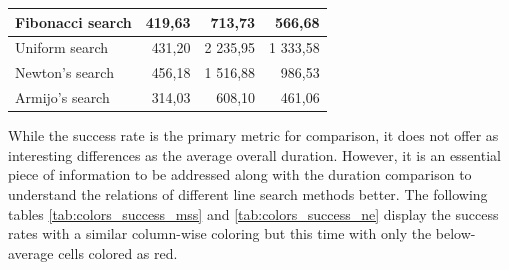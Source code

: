 \documentclass[a4paper,english,titlepage,12pt]{article}
\begin{document}
\begin{table}[H]
\begin{tabular}{|l|r|r|r|}
    Fibonacci search                                                           & 419,63                                                    & \cellcolor[HTML]{C9E9D9}713,73                           & \cellcolor[HTML]{A5DABF}566,68                                \\ \hline
    Uniform search                                                             & 431,20                                                    & \cellcolor[HTML]{E67B73}2 235,95                         & \cellcolor[HTML]{EDA19C}1 333,58                              \\ \hline
    Newton's search                                                             & 456,18                                                    & \cellcolor[HTML]{EDA19C}1 516,88                         & \cellcolor[HTML]{F7D3D0}986,53                                \\ \hline
    Armijo's search                                                              & \cellcolor[HTML]{57BB89}314,03                            & \cellcolor[HTML]{57BB89}608,10                           & \cellcolor[HTML]{57BB89}461,06                                \\ \hline
    \end{tabular}
\end{table}


While the success rate is the primary metric for comparison, it does not offer as interesting differences as the average overall duration. However, it is an essential piece of information to be addressed along with the duration comparison to understand the relations of different line search methods better. The following tables \ref{tab:colors_success_mss} and \ref{tab:colors_success_ne} display the success rates with a similar column-wise coloring but this time with only the below-average cells colored as red.
\end{document}

